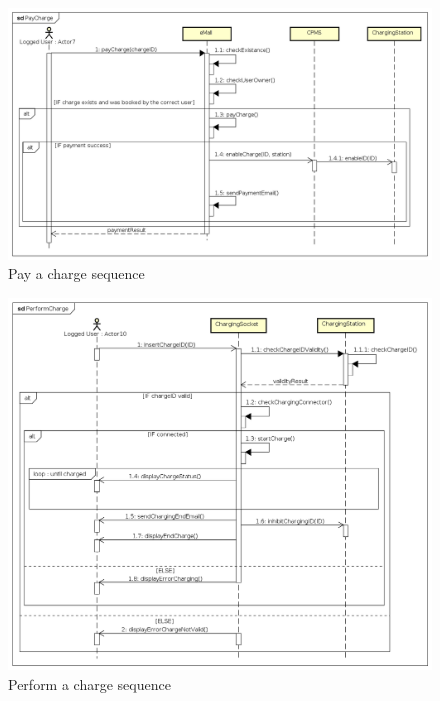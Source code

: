 \begin{figure}[!h]
    \begin{center}
        \includegraphics[keepaspectratio, width=16cm]{Sequence/PayCharge.png}
        \caption{Pay a charge sequence}
    \end{center}
\end{figure}
\begin{figure}[!h]
    \begin{center}
        \includegraphics[keepaspectratio, width=16cm]{Sequence/PerformCharge.png}
        \caption{Perform a charge sequence}
    \end{center}
\end{figure}
